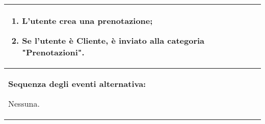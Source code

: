 \documentclass{article}
\begin{document}
\begin{table}[t]
\begin{tabular}{|p{\linewidth}|}
        \cellcolor{gray!20}
        \begin{minipage}{\linewidth}
            \begin{enumerate}[noitemsep]
                \item L'utente crea una prenotazione; %
                \item Se l'utente è Cliente, è inviato alla categoria "Prenotazioni".
            \end{enumerate}
        \end{minipage}
        \vspace{-5pt} \\
        \hline
        \textbf{Sequenza degli eventi alternativa:}
        
        Nessuna. \\
        \hline
    \end{tabular}
\end{table}
\end{document}
